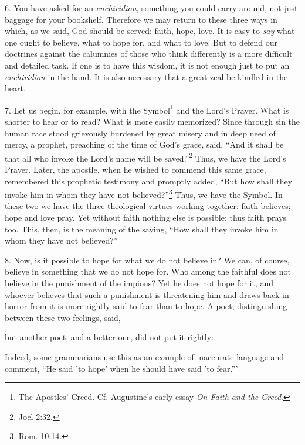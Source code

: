 6. You have asked for an \emph{enchiridion}, something you could carry around, not just baggage for your bookshelf. Therefore we may return to these three ways in which, as we said, God should be served: faith, hope, love. It is easy to \emph{say} what one ought to believe, what to hope for, and what to love. But to defend our doctrines against the calumnies of those who think differently is a more difficult and detailed task. If one is to have this wisdom, it is not enough just to put an \emph{enchiridion} in the hand. It is also necessary that a great zeal be kindled in the heart.


7. Let us begin, for example, with the Symbol\footnote{The Apostles' Creed. Cf. Augustine's early essay \emph{On Faith and the Creed}.} and the Lord's Prayer. What is shorter to hear or to read? What is more easily memorized? Since through sin the human race stood grievously burdened by great misery and in deep need of mercy, a prophet, preaching of the time of God's grace, said, ``And it shall be that all who invoke the Lord's name will be saved.''\footnote{Joel 2:32.} Thus, we have the Lord's Prayer. Later, the apostle, when he wished to commend this same grace, remembered this prophetic testimony and promptly added, ``But how shall they invoke him in whom they have not believed?''\footnote{Rom. 10:14.} Thus, we have the Symbol. In these two we have the three theological virtues working together: faith believes; hope and love pray. Yet without faith nothing else is possible; thus faith prays too. This, then, is the meaning of the saying, ``How shall they invoke him in whom they have not believed?''

8. Now, is it possible to hope for what we do not believe in? We can, of course, believe in something that we do not hope for. Who among the faithful does not believe in the punishment of the impious? Yet he does not hope for it, and whoever believes that such a punishment is threatening him and draws back in horror from it is more rightly said to fear than to hope. A poet, distinguishing between these two feelings, said,

but another poet, and a better one, did not put it rightly:

Indeed, some grammarians use this as an example of inaccurate language and comment, ``He said 'to hope' when he should have said 'to fear.'''

